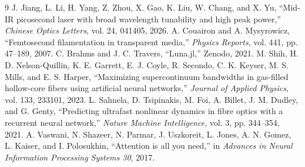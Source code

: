 \documentclass[conference,letterpaper]{IEEEtran}
\begin{document}
\begin{thebibliography}{9}
 J. Jiang, L. Li, H. Yang, Z. Zhou, X. Gao, K. Liu, W. Chang, and X. Yu, ``Mid-IR picosecond laser with broad wavelength tunability and high peak power,'' \emph{Chinese Optics Letters}, vol. 24, 041405, 2026.
 A. Couairon and A. Mysyrowicz, ``Femtosecond filamentation in transparent media,'' \emph{Physics Reports}, vol. 441, pp. 47--189, 2007.
 C. Brahms and J. C. Travers, ``Luna.jl,'' Zenodo, 2021.
 M. Shih, H. D. Nelson-Quillin, K. E. Garrett, E. J. Coyle, R. Secondo, C. K. Keyser, M. S. Mills, and E. S. Harper, ``Maximizing supercontinuum bandwidths in gas-filled hollow-core fibers using artificial neural networks,'' \emph{Journal of Applied Physics}, vol. 133, 233101, 2023.
 L. Salmela, D. Tsipinakis, M. Foi, A. Billet, J. M. Dudley, and G. Genty, ``Predicting ultrafast nonlinear dynamics in fibre optics with a recurrent neural network,'' \emph{Nature Machine Intelligence}, vol. 3, pp. 344--354, 2021.
 A. Vaswani, N. Shazeer, N. Parmar, J. Uszkoreit, L. Jones, A. N. Gomez, L. Kaiser, and I. Polosukhin, ``Attention is all you need,'' in \emph{Advances in Neural Information Processing Systems 30}, 2017.
\end{thebibliography}
\end{document}
